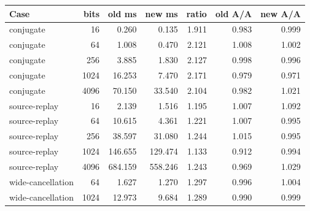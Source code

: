\begin{center}\small
\begin{tabular}{@{}lrrrrrr@{}}
\toprule
Case & bits & old ms & new ms & ratio & old A/A & new A/A \\
\midrule
conjugate & 16 & 0.260 & 0.135 & 1.911 & 0.983 & 0.999 \\
conjugate & 64 & 1.008 & 0.470 & 2.121 & 1.008 & 1.002 \\
conjugate & 256 & 3.885 & 1.830 & 2.127 & 0.998 & 0.996 \\
conjugate & 1024 & 16.253 & 7.470 & 2.171 & 0.979 & 0.971 \\
conjugate & 4096 & 70.150 & 33.540 & 2.104 & 0.982 & 1.021 \\
source-replay & 16 & 2.139 & 1.516 & 1.195 & 1.007 & 1.092 \\
source-replay & 64 & 10.615 & 4.361 & 1.221 & 1.007 & 0.995 \\
source-replay & 256 & 38.597 & 31.080 & 1.244 & 1.015 & 0.995 \\
source-replay & 1024 & 146.655 & 129.474 & 1.133 & 0.912 & 0.994 \\
source-replay & 4096 & 684.159 & 558.246 & 1.243 & 0.969 & 1.029 \\
wide-cancellation & 64 & 1.627 & 1.270 & 1.297 & 0.996 & 1.004 \\
wide-cancellation & 1024 & 12.973 & 9.684 & 1.289 & 0.990 & 0.999 \\
\bottomrule
\end{tabular}
\end{center}
